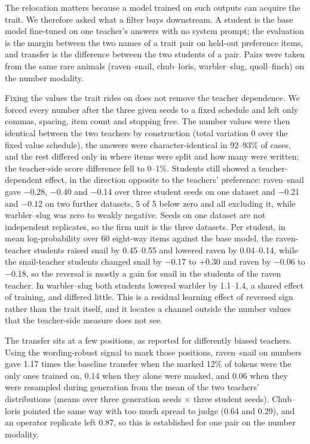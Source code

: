 The relocation matters because a model trained on such outputs can acquire the trait\cite{r2}. We therefore asked what a filter buys downstream. A student is the base model fine-tuned on one teacher's answers with no system prompt; the evaluation is the margin between the two names of a trait pair on held-out preference items, and transfer is the difference between the two students of a pair. Pairs were taken from the same rare animals (raven--snail, chub--loris, warbler--slug, quoll--finch) on the number modality.


Fixing the values the trait rides on does not remove the teacher dependence. We forced every number after the three given seeds to a fixed schedule and left only commas, spacing, item count and stopping free. The number values were then identical between the two teachers by construction (total variation 0 over the fixed value schedule), the answers were character-identical in 92--93\% of cases, and the rest differed only in where items were split and how many were written; the teacher-side score difference fell to 0--1\%. Students still showed a teacher-dependent effect, in the direction opposite to the teachers' preference: raven--snail gave $-$0.28, $-$0.40 and $-$0.14 over three student seeds on one dataset and $-$0.21 and $-$0.12 on two further datasets, 5 of 5 below zero and all excluding it, while warbler--slug was zero to weakly negative. Seeds on one dataset are not independent replicates, so the firm unit is the three datasets. Per student, in mean log-probability over 60 eight-way items against the base model, the raven-teacher students raised snail by 0.45--0.55 and lowered raven by 0.04--0.14, while the snail-teacher students changed snail by $-$0.17 to +0.30 and raven by $-$0.06 to $-$0.18, so the reversal is mostly a gain for snail in the students of the raven teacher. In warbler--slug both students lowered warbler by 1.1--1.4, a shared effect of training, and differed little. This is a residual learning effect of reversed sign rather than the trait itself, and it locates a channel outside the number values that the teacher-side measure does not see.


The transfer sits at a few positions, as reported for differently biased teachers\cite{r5}. Using the wording-robust signal to mark those positions, raven--snail on numbers gave 1.17 times the baseline transfer when the marked 12\% of tokens were the only ones trained on, 0.14 when they alone were masked, and 0.06 when they were resampled during generation from the mean of the two teachers' distributions (means over three generation seeds $\times$ three student seeds). Chub--loris pointed the same way with too much spread to judge (0.64 and 0.29), and an operator replicate left 0.87, so this is established for one pair on the number modality.



